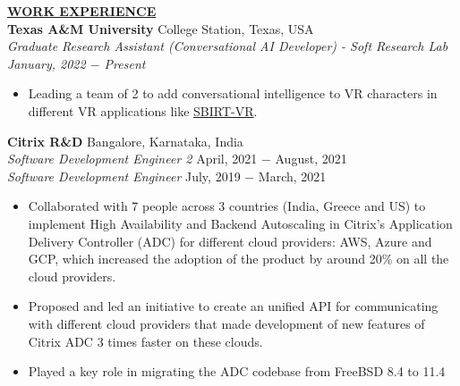\documentclass{article}
\begin{document}
% 
%
\noindent \textbf{\underline{WORK EXPERIENCE}} \\
\noindent \textbf{Texas A\&M University} \hfill College Station, Texas, USA\\
\textit{Graduate Research Assistant (Conversational AI Developer) - Soft Research Lab \hfill January, 2022 $-$ Present}
\begin{itemize}[noitemsep,nolistsep,leftmargin=*]
\item {Leading a team of 2 to add conversational intelligence to VR characters in different VR applications like \href{https://softinteraction.com/portfolio/sbirt-vr}{SBIRT-VR}}.\\
\end{itemize}
\noindent \textbf{Citrix R\&D} \hfill Bangalore, Karnataka, India \\
\textit{Software Development Engineer 2} \hfill April, 2021 $-$ August, 2021 \\
\textit{Software Development Engineer} \hfill July, 2019 $-$ March, 2021 
\begin{itemize}[noitemsep,nolistsep,leftmargin=*]
\item {Collaborated with 7 people across 3 countries (India, Greece and US) to implement High Availability and Backend Autoscaling in Citrix's Application Delivery Controller (ADC) for different cloud providers: AWS, Azure and GCP, which increased the adoption of the product by around 20\% on all the cloud providers.}
\item {Proposed and led an initiative to create an unified API for communicating with different cloud providers that made development of new features of Citrix ADC 3 times faster on these clouds. }
\item {Played a key role in migrating the ADC codebase from FreeBSD 8.4 to 11.4\\}
\end{itemize}
\end{document}
